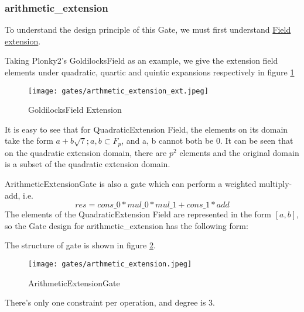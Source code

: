 \subsubsection{arithmetic\_extension}

To understand the design principle of this Gate, we must first understand \href{https://en.wikipedia.org/wiki/Field_extension#Extension_field}{Field extension}. 


Taking Plonky2's GoldilocksField as an example, we give the extension field elements under quadratic, quartic and quintic expansions respectively in figure \ref{fig:goldilocksfield-extension}

\begin{figure}[!ht]
    \centering
    \texttt{[image: gates/arthmetic\_extension\_ext.jpeg]}
    \caption{GoldilocksField Extension}
    \label{fig:goldilocksfield-extension}
\end{figure}

It is easy to see that for QuadraticExtension Field, the elements on its domain take the form $a + b \sqrt{7}; a,b \subset F_p$, and a, b cannot both be 0.
It can be seen that on the quadratic extension domain, there are $p^2$ elements and the original domain is a subset of the quadratic extension domain.

ArithmeticExtensionGate is also a gate which can perform a weighted multiply-add, i.e.
\[res = cons\_0 * mul\_0 * mul\_1 + cons\_1 * add\]
The elements of the QuadraticExtension Field are represented in the form $[a, b]$, so the Gate design for arithmetic\_extension has the following form:

The structure of gate is shown in figure \ref{fig:arthmetic-extension}.
\begin{figure}[!ht]
    \centering
    \texttt{[image: gates/arthmetic\_extension.jpeg]}
    \caption{ArithmeticExtensionGate}
    \label{fig:arthmetic-extension}
\end{figure}

There's only one constraint per operation, and degree is 3.
